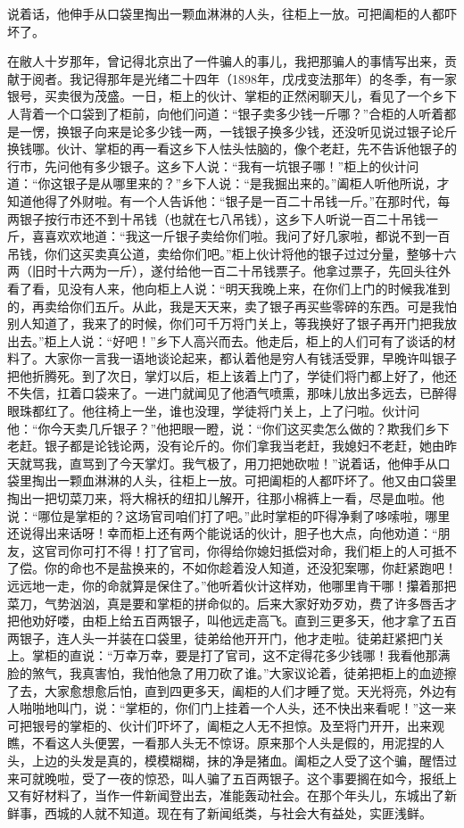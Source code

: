 \documentclass[12pt,UTF8]{ctexbook}
\begin{document}
说着话，他伸手从口袋里掏出一颗血淋淋的人头，往柜上一放。可把阖柜的人都吓坏了。



在敝人十岁那年，曾记得北京出了一件骗人的事儿，我把那骗人的事情写出来，贡献于阅者。我记得那年是光绪二十四年（1898年，戊戌变法那年）的冬季，有一家银号，买卖很为茂盛。一日，柜上的伙计、掌柜的正然闲聊天儿，看见了一个乡下人背着一个口袋到了柜前，向他们问道：“银子卖多少钱一斤哪？”合柜的人听着都是一愣，换银子向来是论多少钱一两，一钱银子换多少钱，还没听见说过银子论斤换钱哪。伙计、掌柜的再一看这乡下人怯头怯脑的，像个老赶，先不告诉他银子的行市，先问他有多少银子。这乡下人说：“我有一坑银子哪！”柜上的伙计问道：“你这银子是从哪里来的？”乡下人说：“是我掘出来的。”阖柜人听他所说，才知道他得了外财啦。有一个人告诉他：“银子是一百二十吊钱一斤。”在那时代，每两银子按行市还不到十吊钱（也就在七八吊钱），这乡下人听说一百二十吊钱一斤，喜喜欢欢地道：“我这一斤银子卖给你们啦。我问了好几家啦，都说不到一百吊钱，你们这买卖真公道，卖给你们吧。”柜上伙计将他的银子过过分量，整够十六两（旧时十六两为一斤），遂付给他一百二十吊钱票子。他拿过票子，先回头往外看了看，见没有人来，他向柜上人说：“明天我晚上来，在你们上门的时候我准到的，再卖给你们五斤。从此，我是天天来，卖了银子再买些零碎的东西。可是我怕别人知道了，我来了的时候，你们可千万将门关上，等我换好了银子再开门把我放出去。”柜上人说：“好吧！”乡下人高兴而去。他走后，柜上的人们可有了谈话的材料了。大家你一言我一语地谈论起来，都认着他是穷人有钱活受罪，早晚许叫银子把他折腾死。到了次日，掌灯以后，柜上该着上门了，学徒们将门都上好了，他还不失信，扛着口袋来了。一进门就闻见了他酒气喷熏，那味儿放出多远去，已醉得眼珠都红了。他往椅上一坐，谁也没理，学徒将门关上，上了闩啦。伙计问他：“你今天卖几斤银子？”他把眼一瞪，说：“你们这买卖怎么做的？欺我们乡下老赶。银子都是论钱论两，没有论斤的。你们拿我当老赶，我媳妇不老赶，她由昨天就骂我，直骂到了今天掌灯。我气极了，用刀把她砍啦！”说着话，他伸手从口袋里掏出一颗血淋淋的人头，往柜上一放。可把阖柜的人都吓坏了。他又由口袋里掏出一把切菜刀来，将大棉袄的纽扣儿解开，往那小棉裤上一看，尽是血啦。他说：“哪位是掌柜的？这场官司咱们打了吧。”此时掌柜的吓得净剩了哆嗦啦，哪里还说得出来话呀！幸而柜上还有两个能说话的伙计，胆子也大点，向他劝道：“朋友，这官司你可打不得！打了官司，你得给你媳妇抵偿对命，我们柜上的人可抵不了偿。你的命也不是盐换来的，不如你趁着没人知道，还没犯案哪，你赶紧跑吧！远远地一走，你的命就算是保住了。”他听着伙计这样劝，他哪里肯干哪！攥着那把菜刀，气势汹汹，真是要和掌柜的拼命似的。后来大家好劝歹劝，费了许多唇舌才把他劝好喽，由柜上给五百两银子，叫他远走高飞。直到三更多天，他才拿了五百两银子，连人头一并装在口袋里，徒弟给他开开门，他才走啦。徒弟赶紧把门关上。掌柜的直说：“万幸万幸，要是打了官司，这不定得花多少钱哪！我看他那满脸的煞气，我真害怕，我怕他急了用刀砍了谁。”大家议论着，徒弟把柜上的血迹擦了去，大家愈想愈后怕，直到四更多天，阖柜的人们才睡了觉。天光将亮，外边有人啪啪地叫门，说：“掌柜的，你们门上挂着一个人头，还不快出来看呢！”这一来可把银号的掌柜的、伙计们吓坏了，阖柜之人无不担惊。及至将门开开，出来观瞧，不看这人头便罢，一看那人头无不惊讶。原来那个人头是假的，用泥捏的人头，上边的头发是真的，模模糊糊，抹的净是猪血。阖柜之人受了这个骗，醒悟过来可就晚啦，受了一夜的惊恐，叫人骗了五百两银子。这个事要搁在如今，报纸上又有好材料了，当作一件新闻登出去，准能轰动社会。在那个年头儿，东城出了新鲜事，西城的人就不知道。现在有了新闻纸类，与社会大有益处，实匪浅鲜。
\end{document}

